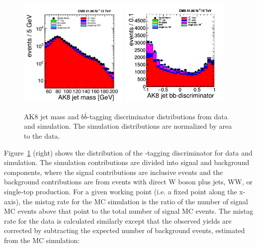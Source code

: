 \begin{figure}
\centering
\includegraphics[width=0.465\textwidth]{figs/ak8jetmass.png}
\includegraphics[width=0.48\textwidth]{figs/ak8jetbbdisc.png}
\caption[AK8 jet mass and $b\bar{b}$-tagging discriminator distributions in data and simulation.]{AK8 jet mass and $b\bar{b}$-tagging discriminator distributions from data and simulation. The simulation distributions are normalized by area to the data.}
\label{fig:dists}
\end{figure}

Figure~\ref{fig:dists} (right) shows the distribution of the \bbbar-tagging discriminator for data and simulation. The simulation contributions are divided into signal  and background components, where the signal contributions are inclusive \ttbar events and the background contributions are from events with direct W boson plus jets, WW, or single-top production.  For a given working point (i.e. a fixed point along the x-axis), the mistag rate for the MC simulation is the ratio of the number of signal MC events above that point to the total number of signal MC events. The mistag rate for the data is calculated similarly except that the observed yields are corrected by subtracting the expected number of background events, estimated from the MC simulation:

